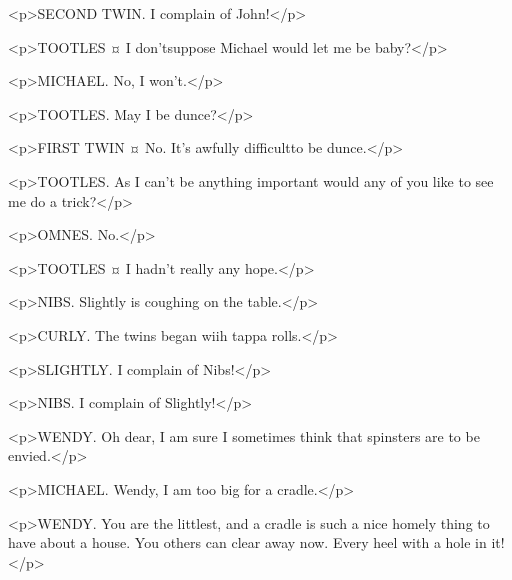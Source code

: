 
<p>SECOND TWIN. I complain of John!</p>


<p>TOOTLES ¤
I don'tsuppose Michael would let me be baby?</p>

<p>MICHAEL. No, I won't.</p>

<p>TOOTLES. May I be dunce?</p>

<p>FIRST TWIN ¤
No. It's awfully difficultto be dunce.</p>

<p>TOOTLES. As I can't be anything important would any of you like to see me do a trick?</p>

<p>OMNES. No.</p>

<p>TOOTLES ¤
I hadn't really any hope.</p>


<p>NIBS. Slightly is coughing on the table.</p>

<p>CURLY. The twins began wiih tappa rolls.</p>

<p>SLIGHTLY. I complain of Nibs!</p>

<p>NIBS. I complain of Slightly!</p>

<p>WENDY. Oh dear, I am sure I sometimes think that spinsters are to be envied.</p>

<p>MICHAEL. Wendy, I am too big for a cradle.</p>

<p>WENDY. You are the littlest, and a cradle is such a nice homely thing to have about a house. You others can clear away now.
Every heel with a hole in it!</p>

